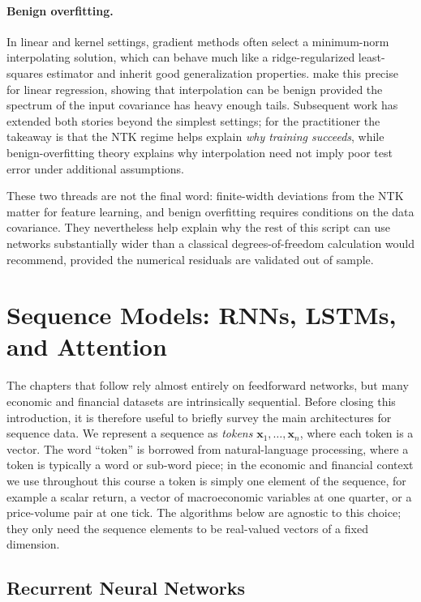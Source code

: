 \documentclass[11pt,a4paper]{report}
\newcommand{\x}{\bm{x}}
\begin{document}
\paragraph{Benign overfitting.}  In linear and kernel settings, gradient methods often select a minimum-norm interpolating solution, which can behave much like a ridge-regularized least-squares estimator and inherit good generalization properties.  \citet{bartlett2020benign} make this precise for linear regression, showing that interpolation can be benign provided the spectrum of the input covariance has heavy enough tails.  Subsequent work has extended both stories beyond the simplest settings; for the practitioner the takeaway is that the NTK regime helps explain \emph{why training succeeds}, while benign-overfitting theory explains why interpolation need not imply poor test error under additional assumptions.

These two threads are not the final word: finite-width deviations from the NTK matter for feature learning, and benign overfitting requires conditions on the data covariance.  They nevertheless help explain why the rest of this script can use networks substantially wider than a classical degrees-of-freedom calculation would recommend, provided the numerical residuals are validated out of sample.

\section{Sequence Models: RNNs, LSTMs, and Attention}
\label{sec:sequence_models}

The chapters that follow rely almost entirely on feedforward networks, but many economic and financial datasets are intrinsically sequential.  Before closing this introduction, it is therefore useful to briefly survey the main architectures for sequence data.  We represent a sequence as \emph{tokens} $\x_1, \dots, \x_n$, where each token is a vector.  The word ``token'' is borrowed from natural-language processing, where a token is typically a word or sub-word piece; in the economic and financial context we use throughout this course a token is simply one element of the sequence, for example a scalar return, a vector of macroeconomic variables at one quarter, or a price-volume pair at one tick.  The algorithms below are agnostic to this choice; they only need the sequence elements to be real-valued vectors of a fixed dimension.

\subsection{Recurrent Neural Networks}
\end{document}
